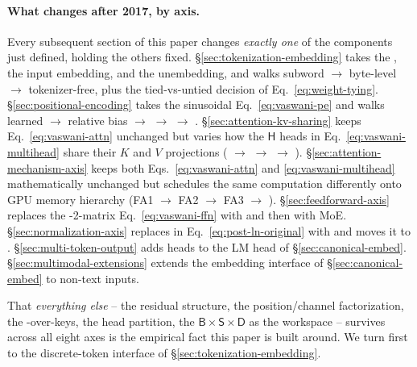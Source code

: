 \paragraph{What changes after 2017, by axis.} Every subsequent
section of this paper changes \emph{exactly one} of the components
just defined, holding the others fixed. \S\ref{sec:tokenization-embedding}
takes the , the input embedding, and the unembedding,
and walks subword $\to$ byte-level $\to$ tokenizer-free, plus the
tied-vs-untied decision of Eq.~\eqref{eq:weight-tying}.
\S\ref{sec:positional-encoding} takes the sinusoidal
Eq.~\eqref{eq:vaswani-pe} and walks learned $\to$  relative bias
$\to$  $\to$  $\to$ .
\S\ref{sec:attention-kv-sharing} keeps Eq.~\eqref{eq:vaswani-attn}
unchanged but varies how the $\mathsf{H}$ heads in
Eq.~\eqref{eq:vaswani-multihead} share their $K$ and $V$
projections ( $\to$  $\to$  $\to$ ).
\S\ref{sec:attention-mechanism-axis} keeps both Eqs.~\eqref{eq:vaswani-attn}
and \eqref{eq:vaswani-multihead} mathematically unchanged but
schedules the same computation differently onto GPU memory hierarchy
(FA1 $\to$ FA2 $\to$ FA3 $\to$ ).
\S\ref{sec:feedforward-axis} replaces the -2-matrix
Eq.~\eqref{eq:vaswani-ffn} with  and then with MoE.
\S\ref{sec:normalization-axis} replaces  in
Eq.~\eqref{eq:post-ln-original} with  and moves it to
.
\S\ref{sec:multi-token-output} adds heads to the LM head of
\S\ref{sec:canonical-embed}.
\S\ref{sec:multimodal-extensions} extends the embedding interface
of \S\ref{sec:canonical-embed} to non-text inputs.

That \emph{everything else} -- the residual structure, the
position/channel factorization, the -over-keys, the head
partition, the $\mathsf{B}\!\times\!\mathsf{S}\!\times\!\mathsf{D}$
 as the workspace -- survives across all eight axes
is the empirical fact this paper is built around. We turn first to
the discrete-token interface of \S\ref{sec:tokenization-embedding}.
